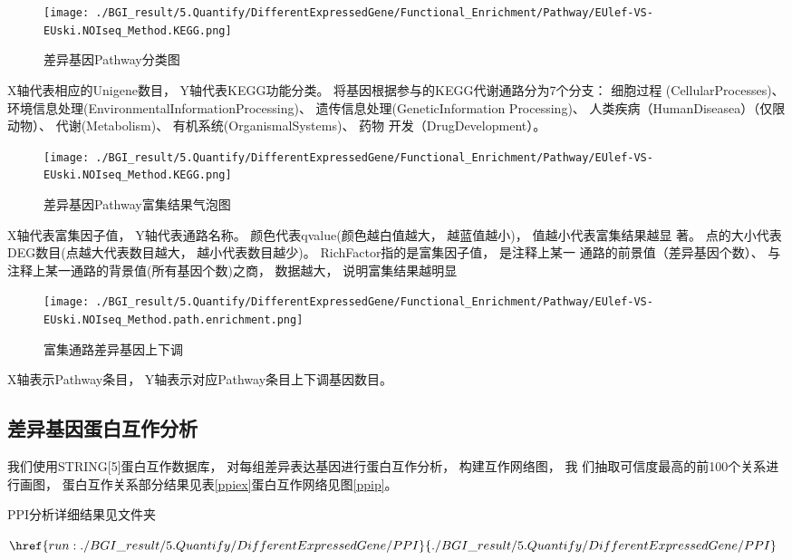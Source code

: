 \documentclass[10pt, oneside,a4paper]{article}
\begin{document}
\begin{figure}[H]
\centering
\texttt{[image: ./BGI\_result/5.Quantify/DifferentExpressedGene/Functional\_Enrichment/Pathway/EUlef-VS-EUski.NOIseq\_Method.KEGG.png]}
\par
\renewcommand{\figurename}{图}
\caption{差异基因Pathway分类图}
\label{kegga}
\end{figure}
\begin{center}
X轴代表相应的Unigene数目， Y轴代表KEGG功能分类。 将基因根据参与的KEGG代谢通路分为7个分支： 细胞过程
(CellularProcesses)、 环境信息处理(EnvironmentalInformationProcessing)、 遗传信息处理(GeneticInformation
Processing)、 人类疾病（HumanDiseasea）（仅限动物）、 代谢(Metabolism)、 有机系统(OrganismalSystems)、 药物
开发（DrugDevelopment）。
\end{center}

\begin{figure}[H]
\centering
\texttt{[image: ./BGI\_result/5.Quantify/DifferentExpressedGene/Functional\_Enrichment/Pathway/EUlef-VS-EUski.NOIseq\_Method.KEGG.png]}
\par
\renewcommand{\figurename}{图}
\caption{差异基因Pathway富集结果气泡图}
\label{keggup}
\end{figure}
\begin{center}
X轴代表富集因子值， Y轴代表通路名称。 颜色代表qvalue(颜色越白值越大， 越蓝值越小)， 值越小代表富集结果越显
著。 点的大小代表DEG数目(点越大代表数目越大， 越小代表数目越少)。 RichFactor指的是富集因子值， 是注释上某一
通路的前景值（差异基因个数）、 与注释上某一通路的背景值(所有基因个数)之商， 数据越大， 说明富集结果越明显
\end{center}

\begin{figure}[H]
\centering
\texttt{[image: ./BGI\_result/5.Quantify/DifferentExpressedGene/Functional\_Enrichment/Pathway/EUlef-VS-EUski.NOIseq\_Method.path.enrichment.png]}
\par
\renewcommand{\figurename}{图}
\caption{富集通路差异基因上下调}
\label{keggenrich}
\end{figure}
\begin{center}
X轴表示Pathway条目， Y轴表示对应Pathway条目上下调基因数目。
\end{center}


\subsection{差异基因蛋白互作分析}
我们使用STRING[5]蛋白互作数据库， 对每组差异表达基因进行蛋白互作分析， 构建互作网络图， 我
们抽取可信度最高的前100个关系进行画图， 蛋白互作关系部分结果见表\ref{ppiex}蛋白互作网络见图\ref{ppip}。\par
PPI分析详细结果见文件夹\par
$\href{run:./BGI\_result/5.Quantify/DifferentExpressedGene/PPI}{./BGI\_result/5.Quantify/DifferentExpressedGene/PPI}$\par
\end{document}
